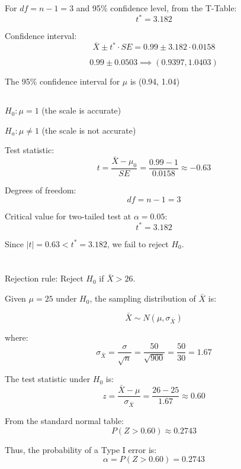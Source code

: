 \documentclass{homework}
\begin{document}
For \( df = n-1 = 3 \) and 95\% confidence level, from the T-Table:
\[
t^* = 3.182
\]

Confidence interval:
\[
\bar{X} \pm t^* \cdot SE = 0.99 \pm 3.182 \cdot 0.0158
\]

\[
0.99 \pm 0.0503 \implies (0.9397, 1.0403)
\]

The 95\% confidence interval for \( \mu \) is (0.94, 1.04)

\subsection{}

\( H_0: \mu = 1 \) (the scale is accurate)

\( H_a: \mu \neq 1 \) (the scale is not accurate)

Test statistic:
\[
t = \frac{\bar{X} - \mu_0}{SE} = \frac{0.99 - 1}{0.0158} \approx -0.63
\]

Degrees of freedom:
\[
df = n - 1 = 3
\]

Critical value for two-tailed test at \( \alpha = 0.05 \):
\[
t^* = 3.182
\]

Since \( |t| = 0.63 < t^* = 3.182 \), we fail to reject \( H_0 \).

\section{}

\subsection{}

Rejection rule: Reject \( H_0 \) if \( \bar{X} > 26 \).

Given \( \mu = 25 \) under \( H_0 \), the sampling distribution of \( \bar{X} \) is:

\[
\bar{X} \sim N(\mu, \sigma_{\bar{X}})
\]

where:
\[
\sigma_{\bar{X}} = \frac{\sigma}{\sqrt{n}} = \frac{50}{\sqrt{900}} = \frac{50}{30} = 1.67
\]

The test statistic under \( H_0 \) is:
\[
z = \frac{\bar{X} - \mu}{\sigma_{\bar{X}}} = \frac{26 - 25}{1.67} \approx 0.60
\]

From the standard normal table:
\[
P(Z > 0.60) \approx 0.2743
\]

Thus, the probability of a Type I error is:
\[
\alpha = P(Z > 0.60) = 0.2743
\]

\subsection{}
\end{document}
